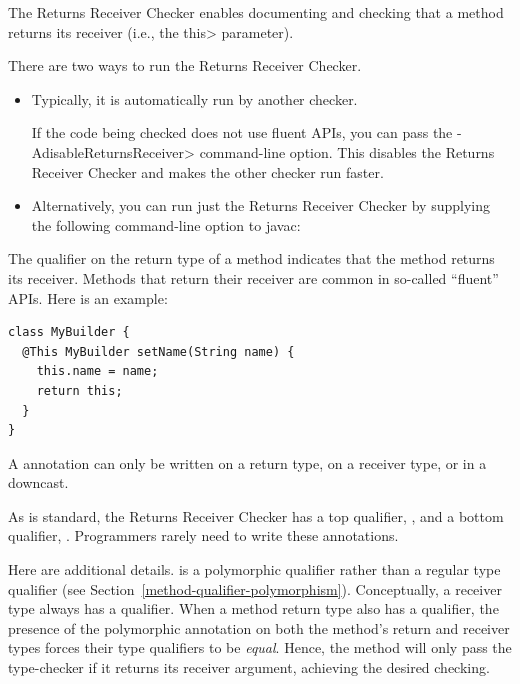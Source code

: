 
The Returns Receiver Checker enables documenting and checking that a method
returns its receiver (i.e., the \<this> parameter).

There are two ways to run the Returns Receiver Checker.
\begin{itemize}
\item
  Typically, it is automatically run by another checker.

  If the code being checked does not use fluent APIs, you can pass the
  \<-AdisableReturnsReceiver> command-line option.  This disables the
  Returns Receiver Checker and makes the other checker run faster.
\item
Alternatively, you can run just the Returns Receiver Checker by
supplying the following command-line option to javac:
\end{itemize}



The qualifier  on the return
type of a method indicates that the method returns its receiver.  Methods
that return their receiver are common in so-called ``fluent'' APIs.  Here
is an example:

\begin{Verbatim}
class MyBuilder {
  @This MyBuilder setName(String name) {
    this.name = name;
    return this;
  }
}
\end{Verbatim}

A  annotation can only be
written on a return type, on a receiver type, or in a downcast.

As is standard, the Returns Receiver Checker has a top qualifier,
, and a bottom qualifier,
.
Programmers rarely need to write these annotations.

Here are additional details.  
is a polymorphic qualifier rather than a regular type qualifier (see
Section~\ref{method-qualifier-polymorphism}). Conceptually, a receiver type always has
a  qualifier. When a method
return type also has a 
qualifier, the presence of the polymorphic annotation on both the method's
return and receiver types forces their type qualifiers to be \emph{equal}. Hence,
the method will only pass the type-checker if it returns its receiver argument,
achieving the desired checking.


